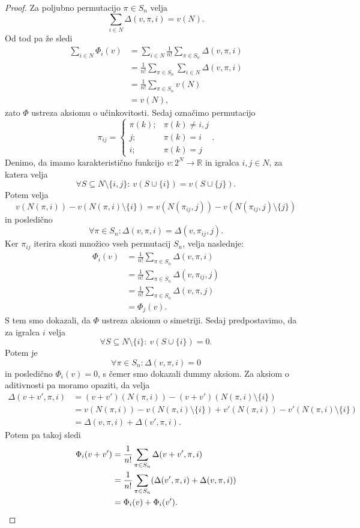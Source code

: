\documentclass[10pt, a4paper]{article}
\newenvironment{noticeC}{%
  \tcolorbox[%
  notitle,
  empty,
  enhanced,  %
  breakable,
  coltext=black, 
  fontupper=\rmfamily,
  noparskip,
  sharp corners,
  boxrule=-1pt,  %
  frame hidden,
  left=7pt,  %
  right=7pt,
  top=5pt,
  bottom=5pt,
  before skip=2.5ex plus 2pt,
  after skip=2.5ex plus 2pt,
  overlay unbroken and last={%
  },
  ]}
{\endtcolorbox}
\newenvironment{dokaz}%
  {\begin{noticeC}\begin{proof}}%
  {\end{proof}\end{noticeC}}
\newcommand{\R}{\mathbb {R}}
\begin{document}
\begin{dokaz}
  Za poljubno permutacijo $\pi \in S_n$ velja 
  $$\sum_{i \in N} \Delta(v, \pi, i) = v(N).$$
  Od tod pa že sledi 
  \begin{align*}
    \sum_{i \in N} \Phi_i (v) &= \sum_{i \in N} \frac{1}{n!} \sum_{\pi \in S_n} \Delta (v, \pi, i)\\
    &= \frac{1}{n!} \sum_{\pi \in S_n} \sum_{i \in N} \Delta (v, \pi, i)\\
    &= \frac{1}{n!} \sum_{\pi \in S_n} v(N)\\
    &= v(N),
  \end{align*}
  zato $\Phi$ ustreza aksiomu o učinkovitosti.
  Sedaj označimo permutacijo $$\pi_{ij} = \begin{cases}
    \pi(k);& \pi(k) \neq i, j\\
    j;& \pi(k) = i\\
    i;& \pi(k) = j
  \end{cases}.$$
  Denimo, da imamo karakteristično funkcijo $v: 2^N \to \R$
  in igralca $i, j \in N$, za katera velja 
  $$\forall S \subseteq N \setminus \{i, j\}:\ v(S \cup \{i\}) = v(S \cup \{j\}).$$
  Potem velja 
  $$v(N(\pi, i)) - v(N(\pi, i) \setminus \{i\}) = v(N(\pi_{ij}, j)) - v(N(\pi_{ij}, j) \setminus \{j\})$$
  in posledično
  $$\forall \pi \in S_n: \Delta(v, \pi, i) = \Delta(v, \pi_{ij}, j).$$
  Ker $\pi_{ij}$ iterira skozi množico vseh permutacij $S_n$, velja naslednje:
  \begin{align*}
    \Phi_i (v) &= \frac{1}{n!} \sum_{\pi \in S_n} \Delta(v, \pi, i)\\
    &= \frac{1}{n!} \sum_{\pi \in S_n} \Delta (v, \pi_{ij}, j)\\
    &= \frac{1}{n!} \sum_{\pi \in S_n} \Delta (v, \pi, j)\\
    &= \Phi_j (v).
  \end{align*}
  S tem smo dokazali, da $\Phi$ ustreza aksiomu o simetriji.
  Sedaj predpostavimo, da za igralca $i$ velja 
  $$\forall S \subseteq N \setminus \{i\}:\ v(S \cup \{i\}) = 0.$$
  Potem je 
  $$\forall \pi \in S_n: \Delta(v, \pi, i) = 0$$ in posledično $\Phi_i (v) = 0$,
  s čemer smo dokazali dummy aksiom.
  Za aksiom o aditivnosti pa moramo opaziti, da velja 
  \begin{align*}
    \Delta(v + v', \pi, i) &= (v + v') (N(\pi, i)) - (v + v')(N(\pi, i) \setminus \{i\})\\
    &= v(N(\pi, i)) - v(N(\pi, i) \setminus \{i\}) + v'(N(\pi, i)) - v'(N(\pi, i) \setminus \{i\})\\
    &= \Delta(v, \pi, i) + \Delta(v', \pi, i).
  \end{align*}
  Potem pa takoj sledi 
  \begin{align*}
    \Phi_i (v + v') &= \frac{1}{n!} \sum_{\pi \in S_n} \Delta(v + v', \pi, i)\\
    &= \frac{1}{n!} \sum_{\pi \in S_n} (\Delta(v', \pi, i) + \Delta(v, \pi, i))\\
    &= \Phi_i(v) + \Phi_i(v'). \qedhere
  \end{align*}
\end{dokaz}
\end{document}

